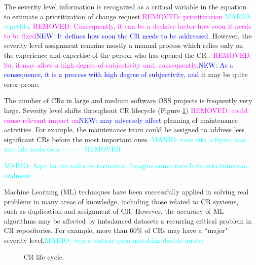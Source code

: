 \documentclass[10pt, conference]{IEEEtran}
\newcommand{\mario}[1]{\noindent\textcolor{cyan}{MARIO: {#1}}}
\newcommand{\rem}[1]{\noindent\textcolor{magenta}{REMOVED: {#1}}}
\newcommand{\new}[1]{\noindent\textcolor{blue}{NEW: {#1}}}
\newcommand{\mario}[1]{}
\newcommand{\rem}[1]{}
\newcommand{\new}[1]{#1}
\begin{document}
The severity level information is recognized as a critical variable in the equation to estimate a prioritization of change request \rem{prioritization}\cite{Tian2012} \mario{repetido}. \rem{Consequently, it can be a decisive factor how soon it needs to be fixed\cite{Lamkanfi2010}}\new{It defines how soon the CR needs to be addressed\cite{Lamkanfi2010}}. However, the severity level assignment remains mostly a manual process which relies only on the experience and expertise of the person who has opened the CR \cite{Cavalcanti2014, Tian2012, Lamkanfi2010}. \rem{So, it may allow a high degree of subjectivity and, consequently,}\new{As a consequence, it is a process with high degree of subjectivity, and} it may be quite error-prone. 

The number of CRs in large and medium software OSS projects\cite{Lamkanfi2011} is frequently very large. Severity level shifts throughout CR lifecycle (Figure \ref{fig:cr-life-cycle}) \rem{could cause relevant impact on}\new{may adversely affect} planning of maintenance activities. For example, the maintenance team could be assigned to address less significant CRs before the most important ones. \mario{voce cita a figura mas nao fala nada dela --------- REMOVER}

\mario{Aqui ha um salto de raciocinio. Imagine como voce faria esta transicao oralment}

Machine Learning (ML) techniques have been successfully applied in solving real problems in many areas of knowledge, including those related to CR systems, such as duplication and assignment of CR\cite{Cavalcanti2014}. However, the accuracy of ML algorithms may be affected by imbalanced datasets \cite{Chawla2009} \textemdash  a recurring critical problem in CR repositories\cite{Tian2015}. For example, more than 60\% of CRs may have a ``major" severity level.\mario{veja a sintaxe para matching double quotes} 


\begin{figure}[hbt!]  
  \centering
  \caption{CR life cycle\cite{Sommerville2010}.}
  \label{fig:cr-life-cycle}
\end{figure}
\end{document}
